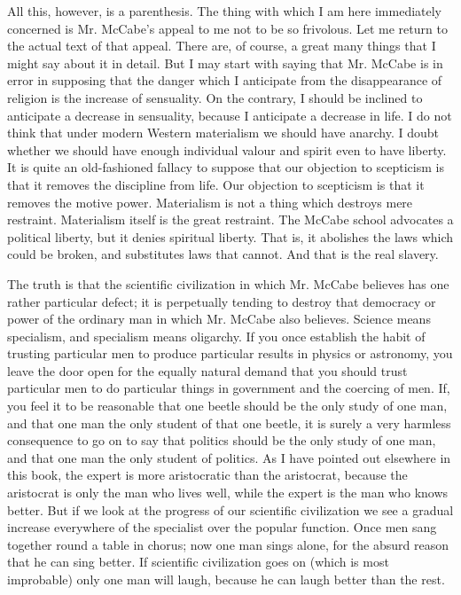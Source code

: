 All this, however, is a parenthesis. The thing with which I am here immediately concerned is Mr. McCabe’s appeal to me not to be so frivolous. Let me return to the actual text of that appeal. There are, of course, a great many things that I might say about it in detail. But I may start with saying that Mr. McCabe is in error in supposing that the danger which I anticipate from the disappearance of religion is the increase of sensuality. On the contrary, I should be inclined to anticipate a decrease in sensuality, because I anticipate a decrease in life. I do not think that under modern Western materialism we should have anarchy. I doubt whether we should have enough individual valour and spirit even to have liberty. It is quite an old-fashioned fallacy to suppose that our objection to scepticism is that it removes the discipline from life. Our objection to scepticism is that it removes the motive power. Materialism is not a thing which destroys mere restraint. Materialism itself is the great restraint. The McCabe school advocates a political liberty, but it denies spiritual liberty. That is, it abolishes the laws which could be broken, and substitutes laws that cannot. And that is the real slavery.

The truth is that the scientific civilization in which Mr. McCabe believes has one rather particular defect; it is perpetually tending to destroy that democracy or power of the ordinary man in which Mr. McCabe also believes. Science means specialism, and specialism means oligarchy. If you once establish the habit of trusting particular men to produce particular results in physics or astronomy, you leave the door open for the equally natural demand that you should trust particular men to do particular things in government and the coercing of men. If, you feel it to be reasonable that one beetle should be the only study of one man, and that one man the only student of that one beetle, it is surely a very harmless consequence to go on to say that politics should be the only study of one man, and that one man the only student of politics. As I have pointed out elsewhere in this book, the expert is more aristocratic than the aristocrat, because the aristocrat is only the man who lives well, while the expert is the man who knows better. But if we look at the progress of our scientific civilization we see a gradual increase everywhere of the specialist over the popular function. Once men sang together round a table in chorus; now one man sings alone, for the absurd reason that he can sing better. If scientific civilization goes on (which is most improbable) only one man will laugh, because he can laugh better than the rest.

